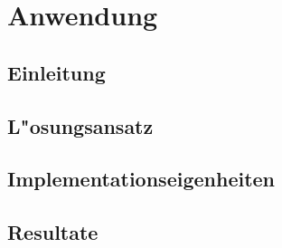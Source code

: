 \chapter{Anwendung}
\section{Einleitung}
\section{L"osungsansatz}
\section{Implementationseigenheiten}
\section{Resultate}
